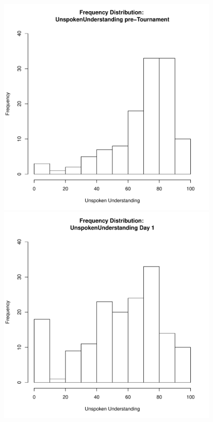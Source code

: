 \documentclass[12pt]{report}
\begin{document}
{\begin{figure}[htbp]
  \label{fig:indPerformanceDist}
\end{figure}
\begin{figure}[htbp]
  \includegraphics[scale =.4]{../images/distUnspokenUnderstandingPre.pdf}
  \includegraphics[scale =.4]{../images/distUnspokenUnderstandingDay1.pdf}

\end{figure}}
\end{document}

